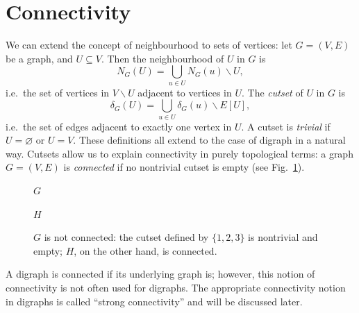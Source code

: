 \documentclass[a4paper]{book}
\theoremstyle{changebreak}                %
\begin{document}
\section{Connectivity}
\label{s:graph:connected}
We can extend the concept of neighbourhood to sets of vertices: let
$G=(V,E)$ be a graph, and $U\subseteq V$. Then the neighbourhood of
$U$ in $G$ is 
\begin{equation*}
  N_G(U)=\bigcup\limits_{u\in U} N_G(u)\smallsetminus U, 
\end{equation*}
i.e.~the set of vertices in $V\smallsetminus U$ adjacent to vertices
in $U$.  The {\it cutset} of $U$ in $G$ is
\begin{equation*}
  \delta_G(U)=\bigcup\limits_{u\in U}\delta_G(u)\smallsetminus E[U],
\end{equation*}
i.e.~the set of edges adjacent to exactly one vertex in $U$.
A cutset is {\it trivial} if $U=\varnothing$ or
$U=V$.  These definitions all extend to the case of digraph in a
natural way. Cutsets allow us to explain connectivity in purely
topological terms: a graph $G=(V,E)$ is {\it
  connected} if no nontrivial
cutset is empty (see Fig.~\ref{f:connected}).
\begin{figure}[!ht]
\begin{center}
\begin{minipage}{5cm}
$G$
\end{minipage}
\hspace*{1cm}
\begin{minipage}{5cm}
$H$
\end{minipage}
\end{center}
\caption{$G$ is not connected: the cutset defined by $\{1,2,3\}$ is
  nontrivial and empty; $H$, on the other hand, is connected.}
\label{f:connected}
\end{figure}

A digraph is connected if its underlying graph is; however, this
notion of connectivity is not often used for digraphs. The appropriate
connectivity notion in digraphs is called ``strong
connectivity'' and will be discussed
later.
\end{document}
